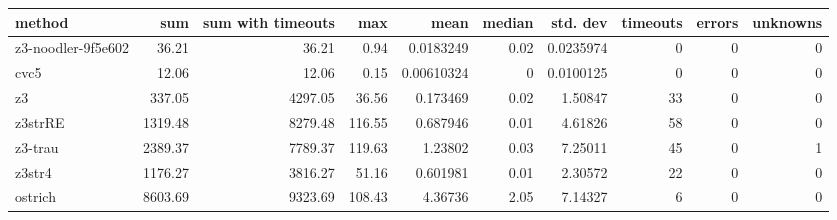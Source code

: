\begin{tabular}{lrrrrrrrrr}
\hline
 method             &     sum &   sum with timeouts &    max &       mean &   median &   std. dev &   timeouts &   errors &   unknowns \\
\hline
 z3-noodler-9f5e602 &   36.21 &               36.21 &   0.94 & 0.0183249  &     0.02 &  0.0235974 &          0 &        0 &          0 \\
 cvc5               &   12.06 &               12.06 &   0.15 & 0.00610324 &     0    &  0.0100125 &          0 &        0 &          0 \\
 z3                 &  337.05 &             4297.05 &  36.56 & 0.173469   &     0.02 &  1.50847   &         33 &        0 &          0 \\
 z3strRE            & 1319.48 &             8279.48 & 116.55 & 0.687946   &     0.01 &  4.61826   &         58 &        0 &          0 \\
 z3-trau            & 2389.37 &             7789.37 & 119.63 & 1.23802    &     0.03 &  7.25011   &         45 &        0 &          1 \\
 z3str4             & 1176.27 &             3816.27 &  51.16 & 0.601981   &     0.01 &  2.30572   &         22 &        0 &          0 \\
 ostrich            & 8603.69 &             9323.69 & 108.43 & 4.36736    &     2.05 &  7.14327   &          6 &        0 &          0 \\
\hline
\end{tabular}
